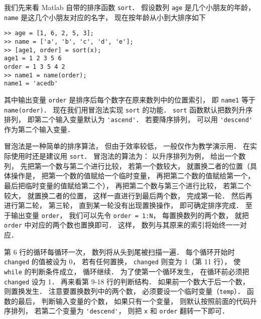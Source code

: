 
我们先来看 Matlab 自带的排序函数 \lstinline|sort|． 假设数列 \lstinline|age| 是几个小朋友的年龄， \lstinline|name| 是这几个小朋友对应的名字， 现在按年龄从小到大排序如下
\begin{lstlisting}[language=MatlabCom]
>> age = [1, 6, 2, 5, 3];
>> name = ['a', 'b', 'c', 'd', 'e'];
>> [age1, order] = sort(x);
age1 = 1 2 3 5 6
order = 1 3 5 4 2
>> name1 = name(order);
name1 = 'acedb'
\end{lstlisting}
其中输出变量 \lstinline|order| 是排序后每个数字在原来数列中的位置索引， 即 \lstinline|name1| 等于 \lstinline|name(order)|． 现在我们用冒泡法实现 \lstinline|sort| 的功能． \lstinline|sort| 函数默认把数列升序排列， 即第二个输入变量默认为 \lstinline|'ascend'|． 若要降序排列， 可以用 \lstinline|'descend'| 作为第二个输入变量．

冒泡法是一种简单的排序算法， 但由于效率较低， 一般仅作为教学演示用． 在实际使用时还是建议用 \lstinline|sort|． 冒泡法的算法为： 以升序排列为例， 给出一个数列， 先把第一个数与第二个进行比较， 若第一个数较大， 就置换二者的位置（具体操作是， 把第一个数的值赋给一个临时变量， 再把第二个数的值赋给第一个， 最后把临时变量的值赋给第二个）， 再把第二个数与第三个进行比较， 若第二个较大， 就置换二者的位置， 这样一直进行到最后两个数， 完成第一轮． 然后再进行第二轮， 第三轮， 直到某一轮没有出现置换操作， 即可确定排序完成． 至于输出变量 \lstinline|order|， 我们可以先令 \lstinline|order = 1:N|， 每置换数列的两个数， 就把 \lstinline|order| 中对应的两个数也置换即可． 这样， 数列与其原来的索引将始终一一对应． 


第 6 行的循环每循环一次， 数列将从头到尾被扫描一遍． 每个循环开始时 \lstinline|changed| 的值被设为 0， 若有任何置换， \lstinline|changed| 则变为 1（第 11 行）， 使 \lstinline|while| 的判断条件成立， 循环继续． 为了使第一个循环发生， 在循环前必须把 \lstinline|changed| 设为 1． 再来看第 9-18 行的判断结构． 如果前一个数大于后一个数， 则置换发生． 注意要置换数列中的两个数， 必须要设一个临时变量（\lstinline|temp|）． 函数的最后， 判断输入变量的个数， 如果只有一个变量， 则默认按照前面的代码升序排列， 若第二个变量为 \lstinline|'descend'|， 则把 \lstinline|x| 和 \lstinline|order| 翻转一下即可．
